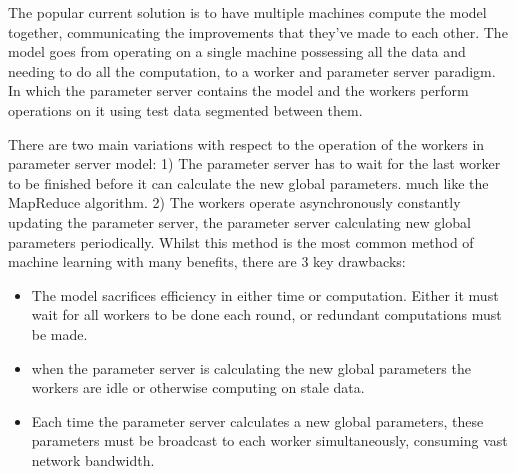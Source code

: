 
The popular current solution is to have multiple machines compute the model
together, communicating the improvements that they've made to each other. The
model goes from operating on a single machine possessing all the data and
needing to do all the computation, to a worker and parameter server paradigm. In
which the parameter server contains the model and the workers perform operations
on it using test data segmented between them. \cite{LI2014ParameterServers}
\par

There are two main variations with respect to the operation of the workers in
parameter server model: 1) The parameter server has to wait for the last worker
to be finished before it can calculate the new global parameters. much like the
MapReduce algorithm. \cite{googlemapreduce2008} 2) The workers operate
asynchronously constantly updating the parameter server, the parameter server
calculating new global parameters periodically.  \cite{Qirong2013SSP} Whilst
this method is the most common method of machine learning with many benefits,
there are 3 key drawbacks:
\begin{itemize}
    \item The model sacrifices efficiency in either time or computation. Either
    it must wait for all workers to be done each round, or redundant
    computations must be made. \cite{Chilimbi2014ADAM}
    \item when the parameter server is calculating the new global parameters the
    workers are idle or otherwise computing on stale data.
    \cite{Verbraeken2020MLSurvey}
    \item Each time the parameter server calculates a new global parameters,
    these parameters must be broadcast to each worker simultaneously, consuming
    vast network bandwidth. \cite{LI2014ParameterServers}
\end{itemize}

